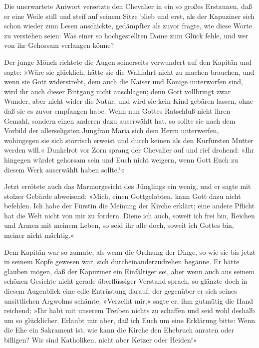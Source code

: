 \pagenum{[112]} Die unerwartete Antwort versetzte den Chevalier in
ein so großes Erstaunen, daß er eine Weile still und steif auf
seinem Sitze blieb und erst, als der Kapuziner sich schon wieder
zum Lesen anschickte, gedämpfter als zuvor fragte, wie diese Worte
zu verstehen seien: Was einer so hochgestellten Dame zum Glück
fehle, und wer von ihr Gehorsam verlangen könne?

Der junge Mönch richtete die Augen seinerseits verwundert auf den
Kapitän und sagte: »Wäre sie glücklich, hätte sie die Wallfahrt
nicht zu machen brauchen, und wenn sie Gott widerstrebt, dem auch
die Kaiser und Könige unterworfen sind, wird ihr auch dieser
Bittgang nicht anschlagen; denn Gott vollbringt zwar Wunder, aber
nicht wider die Natur, und wird sie kein Kind gebären lassen, ohne
daß sie es zuvor empfangen habe. Wenn nun Gottes Ratschluß nicht
ihren Gemahl, sondern einen anderen dazu auserwählt hat, so sollte
sie nach dem Vorbild der allerseligsten Jungfrau Maria sich dem
Herrn unterwerfen, wohingegen sie sich störrisch erweist und durch
keinen als den Kurfürsten Mutter werden will.« Dunkelrot vor Zorn
sprang der Chevalier auf und rief drohend: »Ihr hingegen würdet
gehorsam sein und Euch nicht weigern, wenn Gott Euch zu diesem Werk
auserwählt haben sollte?«

Jetzt errötete auch das Marmorgesicht des Jünglings ein wenig, und
er sagte mit stolzer Gebärde abweisend: »Mich, einen Gottgelobten,
kann Gott dazu nicht befehlen. Ich habe der Fürstin die Meinung der
Kirche erklärt; eine andere Pflicht hat die Welt nicht von mir zu
fordern. Diene ich auch, soweit ich frei bin, Reichen und Armen mit
meinem Leben, so seid ihr alle doch, soweit ich Gottes bin, meiner
nicht mächtig.«

\pagenum{[113]} Dem Kapitän war so zumute, als wenn die Ordnung der
Dinge, so wie sie bis jetzt in seinem Kopfe gewesen war, sich
durcheinanderzudrehen begänne. Er hätte glauben mögen, daß der
Kapuziner ein Einfältiger sei, aber wenn auch aus seinem schönen
Gesichte nicht gerade überflüssiger Verstand sprach, so glänzte
doch in diesem Augenblick eine edle Entrüstung darauf, der
gegenüber er sich seines unsittlichen Argwohns schämte. »Verzeiht
mir,« sagte er, ihm gutmütig die Hand reichend; »Ihr habt mit
unserem Treiben nichts zu schaffen und seid wohl deshalb um so
glücklicher. Erlaubt mir aber, daß ich Euch um eine Erklärung
bitte: Wenn die Ehe ein Sakrament ist, wie kann die Kirche den
Ehebruch anraten oder billigen? Wir sind Katholiken, nicht aber
Ketzer oder Heiden!«

